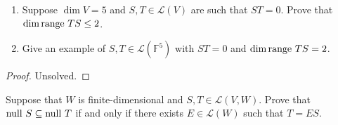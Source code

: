 \begin{exercise}
    \begin{enumerate}[label={(\alph*)}]
        \item Suppose $\dim V = 5$ and $S, T \in \mathcal{L}(V)$ are such that $ST = 0$. Prove that $\dim \operatorname{range}\,{TS} \leq 2$.
        \item Give an example of $S, T \in \mathcal{L}(\mathbb{F}^{5})$ with $ST = 0$ and $\dim\operatorname{range}\,{TS} = 2$.
    \end{enumerate}
\end{exercise}

\begin{proof}
    Unsolved.
\end{proof}
\newpage

\begin{exercise}\label{chapter3:sectionB:exercise25}
    Suppose that $W$ is finite-dimensional and $S, T \in \mathcal{L}(V, W)$. Prove that $\operatorname{null}\,{S} \subseteq \operatorname{null}\,{T}$ if and only if there exists $E \in \mathcal{L}(W)$ such that $T = ES$.
\end{exercise}

